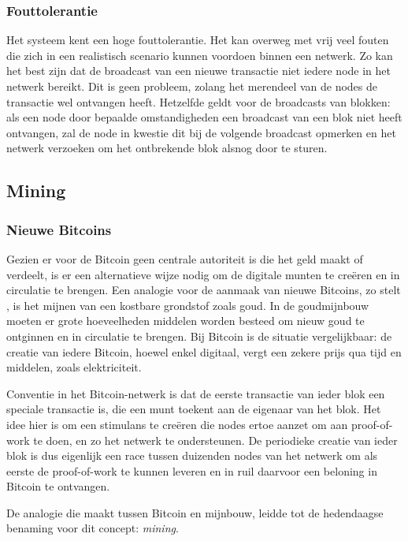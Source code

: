 		\subsubsection{Fouttolerantie}
		Het systeem kent een hoge fouttolerantie. Het kan overweg met vrij veel fouten die zich in een realistisch scenario kunnen voordoen binnen een netwerk. Zo kan het best zijn dat de broadcast van een nieuwe transactie niet iedere node in het netwerk bereikt. Dit is geen probleem, zolang het merendeel van de nodes de transactie wel ontvangen heeft. Hetzelfde geldt voor de broadcasts van blokken: als een node door bepaalde omstandigheden een broadcast van een blok niet heeft ontvangen, zal de node in kwestie dit bij de volgende broadcast opmerken en het netwerk verzoeken om het ontbrekende blok alsnog door te sturen.~\autocite{Nakamoto2008}
	\subsection{Mining}
		\subsubsection{Nieuwe Bitcoins}
		Gezien er voor de Bitcoin geen centrale autoriteit is die het geld maakt of verdeelt, is er een alternatieve wijze nodig om de digitale munten te creëren en in circulatie te brengen. Een analogie voor de aanmaak van nieuwe Bitcoins, zo stelt \textcite{Nakamoto2008}, is het mijnen van een kostbare grondstof zoals goud. In de goudmijnbouw moeten er grote hoeveelheden middelen worden besteed om nieuw goud te ontginnen en in circulatie te brengen. Bij Bitcoin is de situatie vergelijkbaar: de creatie van iedere Bitcoin, hoewel enkel digitaal, vergt een zekere prijs qua tijd en middelen, zoals elektriciteit. ~\autocite{Nakamoto2008}
		
		Conventie in het Bitcoin-netwerk is dat de eerste transactie van ieder blok een speciale transactie is, die een munt toekent aan de eigenaar van het blok. Het idee hier is om een stimulans te creëren die nodes ertoe aanzet om aan proof-of-work te doen, en zo het netwerk te ondersteunen. De periodieke creatie van ieder blok is dus eigenlijk een race tussen duizenden nodes van het netwerk om als eerste de proof-of-work te kunnen leveren en in ruil daarvoor een beloning in Bitcoin te ontvangen. ~\autocite{Nakamoto2008}
		
		De analogie die \textcite{Nakamoto2008} maakt tussen Bitcoin en mijnbouw, leidde tot de hedendaagse benaming voor dit concept: \textit{mining}. 
		
